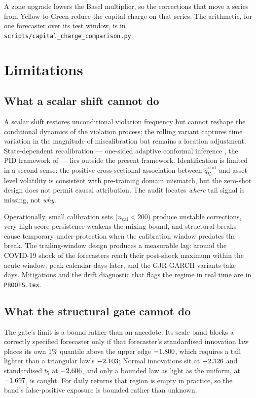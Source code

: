 \documentclass[preprint,11pt,authoryear]{elsarticle}
\newcommand{\1}{\boldsymbol{1}}
\newcommand{\qVstat}{\hat{q}_{\scriptscriptstyle\mathrm{V}}^{\,\mathrm{stat}}}
\begin{document}
A zone upgrade lowers the Basel multiplier, so the corrections that move a series from Yellow to Green reduce the capital charge on that series. The arithmetic, for one forecaster over its test window, is in \texttt{scripts/capital\_charge\_comparison.py}.

\section{Limitations}
\label{sec:discuss}
\label{sec:failure}

\subsection{What a scalar shift cannot do}

A scalar shift restores unconditional violation frequency but cannot reshape the
conditional dynamics of the violation process; the rolling variant captures time
variation in the magnitude of miscalibration but remains a location adjustment.
State-dependent recalibration --- one-sided adaptive conformal inference
\citep{gibbs2021adaptive}, the PID framework of \citet{angelopoulos2024pid} ---
lies outside the present framework. Identification is limited in a second sense:
the positive cross-sectional association between $\qVstat$ and asset-level
volatility is consistent with pre-training domain mismatch,
but the zero-shot design does not permit causal attribution. The audit locates
\emph{where} tail signal is missing, not \emph{why}.

Operationally, small calibration sets ($n_{\mathrm{cal}} < 200$) produce unstable
corrections, very high score persistence weakens the mixing bound, and structural
breaks cause temporary under-protection when the calibration window predates the
break. The trailing-window design produces a measurable lag: around the COVID-19
shock \nLagImmediate{} of the \nLagForecasters{} forecasters reach their
post-shock maximum within the acute window, \nLagMidN{} peak \nLagMidDays{}
calendar days later, and the \nLagLateN{} GJR-GARCH variants take
\nLagLateDays{} days. Mitigations and the drift diagnostic that flags the regime in real
time are in \texttt{PROOFS.tex}.

\subsection{What the structural gate cannot do}
\label{sec:gate_limits}

The gate's limit is a bound rather than an anecdote. Its scale band blocks a
correctly specified forecaster only if that forecaster's standardised innovation
law places its own $1\%$ quantile above the upper edge $-1.800$, which
requires a tail lighter than a triangular law's $-2.103$; Normal
innovations sit at $-2.326$ and standardised $t_5$ at $-2.606$,
and only a bounded law as light as the uniform, at $-1.697$, is caught.
For daily returns that region is empty in practice, so the band's false-positive
exposure is bounded rather than unknown.
\end{document}
